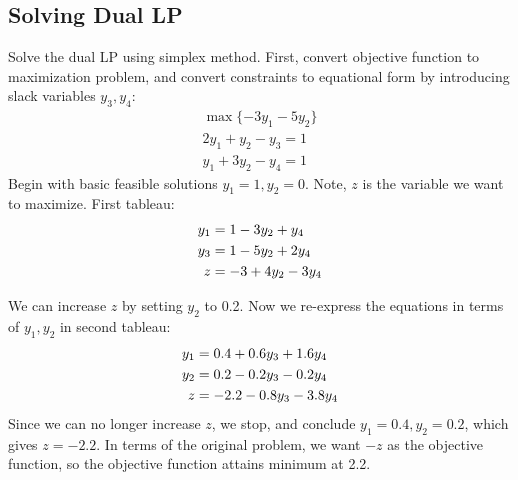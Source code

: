 \documentclass{article}
\begin{document}
\subsection*{Solving Dual LP}
Solve the dual LP using simplex method. First, convert objective function to maximization problem, and convert constraints to equational form by introducing slack variables $y_3, y_4$:
\begin{align*}
\max \{-3y_1-5y_2\} \\
2y_1+y_2-y_3 =1 \\
y_1+3y_2-y_4=1
\end{align*}
Begin with basic feasible solutions $y_1=1, y_2=0$. Note, $z$ is the variable we want to maximize. First tableau:
\begin{align}
y_1 &= 1-3y_2+y_4  \\
y_3 &= 1-5y_2+2y_4 \notag \\
z &= -3+4y_2-3y_4 \notag
\end{align}

We can increase $z$ by setting $y_2$ to 0.2. Now we re-express the equations in terms of $y_1,y_2$ in second tableau:
\begin{align}
y_1 &= 0.4+0.6y_3+1.6y_4 \\
y_2 &= 0.2-0.2y_3-0.2y_4 \notag \\
z &= -2.2 - 0.8y_3-3.8y_4 \notag
\end{align}
Since we can no longer increase $z$, we stop, and conclude $y_1=0.4, y_2=0.2$, which gives $z=-2.2$. In terms of the original problem, we want $-z$ as the objective function, so the objective function attains minimum at 2.2.



\pagebreak
\end{document}
